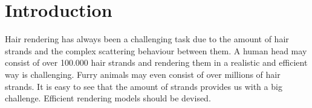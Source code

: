 \documentclass[11pt,a4paper]{report}
\begin{document}







%
%
\tableofcontents

\chapter{Introduction}


Hair rendering has always been a challenging task due to the amount of hair strands and the complex scattering behaviour between them. A human head may consist of over 100.000 hair strands and rendering them in a realistic and efficient way is challenging. Furry animals may even consist of over millions of hair strands. It is easy to see that the amount of strands provides us with a big challenge. Efficient rendering models should be devised.\\
\end{document}
